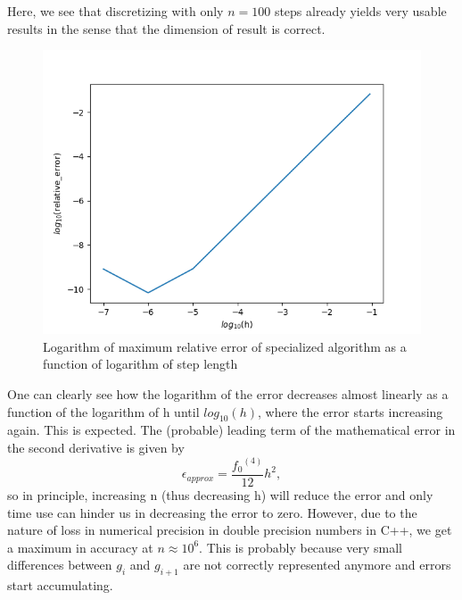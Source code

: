\documentclass[10pt,a4paper]{article}
\begin{document}
Here, we see that discretizing with only $n=100$ steps already yields very usable results in the sense that the dimension of result is correct.
\begin{figure}[H]
	\includegraphics[width =1.2\textwidth]{error.png}
	\caption[Relative error of specialized algorithm]{Logarithm of maximum relative error of specialized algorithm as a function of logarithm of step length}
	\label{Figure 3}
\end{figure}
One can clearly see how the logarithm of the error decreases almost linearly as a function of the logarithm of h until $log_{10}(h)$, where the error starts increasing again. This is expected. The (probable) leading term of the mathematical error in the second derivative is given by $$\epsilon_{approx}=\frac{{f_0}^{(4)}}{12}h^2,$$ so in principle, increasing n (thus decreasing h) will reduce the error and only time use can hinder us in decreasing the error to zero. However, due to the nature of loss in numerical precision in double precision numbers in C++, we get a maximum in accuracy at $n \approx 10^6$.  This is probably because very small differences between $g_i$ and $g_{i+1}$
 are not correctly represented anymore and errors start accumulating.
\end{document}
